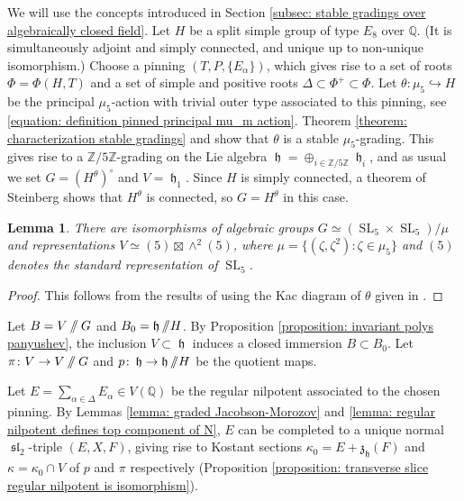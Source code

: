 \documentclass{article} %
\newtheorem{lemma}[proposition]{Lemma}
\numberwithin{equation}{section}
\theoremstyle{definition}
\DeclareMathOperator{\SL}{SL}
\DeclareMathOperator{\liesl}{\mathfrak{sl}}
\DeclareMathOperator{\lieh}{\mathfrak{h}}
\newcommand{\GIT}{\mathbin{/\mkern-6mu/}}
\newcommand{\Q}{\mathbb{Q}}
\newcommand{\Z}{\mathbb{Z}}
\newcommand{\frakh}{\mathfrak h}
\newcommand{\frakz}{\mathfrak z}
\begin{document}
We will use the concepts introduced in Section \ref{subsec: stable gradings over algebraically closed field}.
Let $H$ be a split simple group of type $E_8$ over $\Q$.
(It is simultaneously adjoint and simply connected, and unique up to non-unique isomorphism.)
Choose a pinning $(T,P, \{E_{\alpha}\})$, which gives rise to a set of roots $\Phi = \Phi(H,T)$ and a set of simple and positive roots $\Delta\subset \Phi^+\subset \Phi$.
Let $\theta\colon \mu_5\hookrightarrow H$ be the principal $\mu_5$-action with trivial outer type associated to this pinning, see \eqref{equation: definition pinned principal mu_m action}.
Theorem \ref{theorem: characterization stable gradings} and \cite[Section 7.1, Table 5]{GrossLevyReederYu-GradingsPosRank} show that $\theta$ is a stable $\mu_5$-grading.
This gives rise to a $\Z/5\Z$-grading on the Lie algebra $\lieh = \oplus_{i\in \Z/5\Z} \lieh_i$, and as usual we set $G = (H^{\theta})^{\circ}$ and $V = \lieh_1$.
Since $H$ is simply connected, a theorem of Steinberg \cite[Theorem 8.1]{Steinberg-Endomorphismsofalgebraicgroups} shows that $H^{\theta}$ is connected, so $G = H^{\theta}$ in this case.

\begin{lemma}\label{lemma: explicitGV5grading}
    There are isomorphisms of algebraic groups $G\simeq (\SL_5\times\SL_5)/\mu$ and representations $V \simeq (5) \boxtimes \wedge^2(5)$, where $\mu = \{(\zeta, \zeta^2)\colon \zeta\in \mu_5\}$ and $(5)$ denotes the standard representation of $\SL_5$.
\end{lemma}
\begin{proof}
    This follows from the results of \cite{Reeder-torsion} using the Kac diagram of $\theta$ given in \cite[\S7.1, Table 5]{GrossLevyReederYu-GradingsPosRank}.
\end{proof}


Let $B = V\GIT G$ and $B_0 = \lieh \GIT H$.
By Proposition \ref{proposition: invariant polys panyushev}, the inclusion $V\subset \lieh$ induces a closed immersion $B\subset B_0$.
Let $\pi\colon V\rightarrow V\GIT G$ and $p\colon \lieh \rightarrow \lieh \GIT H$ be the quotient maps.

Let $E = \sum_{\alpha \in \Delta} E_{\alpha}\in V(\Q)$ be the regular nilpotent associated to the chosen pinning. By Lemmas \ref{lemma: graded Jacobson-Morozov} and \ref{lemma: regular nilpotent defines top component of N}, $E$ can be completed to a unique normal $\liesl_2$-triple $(E,X,F)$, giving rise to Kostant sections $\kappa_0 = E + \frakz_{\frakh}(F)$ and $\kappa = \kappa_0 \cap V$ of $p$ and $\pi$ respectively (Proposition \ref{proposition: transverse slice regular nilpotent is isomorphism}).
\end{document}
